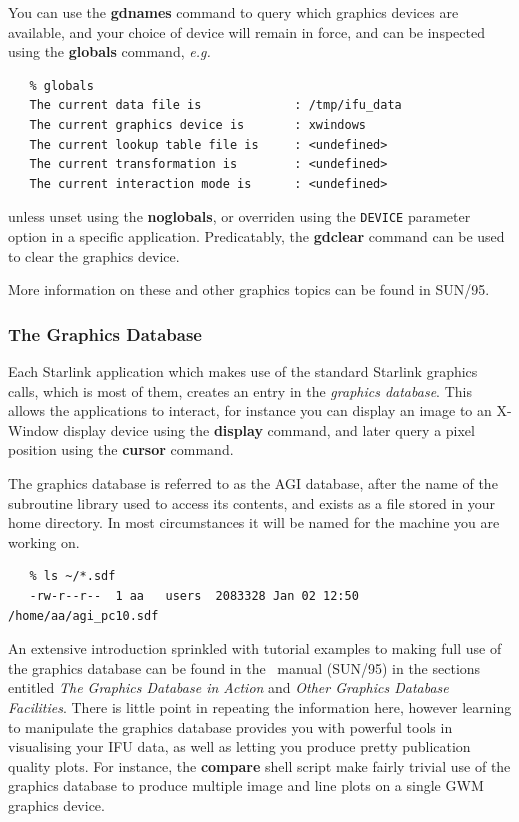 \documentclass[twoside,11pt]{article}
\newcommand{\xref}[3]{#1}
\begin{document}
{You can use the \xref{{\bf gdnames}}{sun95}{GDNAMES} command to query which
graphics devices are available, and your choice of device will remain
in force, and can be inspected using the
\xref{{\bf globals}}{sun95}{GLOBALS} command, \emph{e.g.}\

\small\begin{verbatim}
   % globals
   The current data file is             : /tmp/ifu_data
   The current graphics device is       : xwindows
   The current lookup table file is     : <undefined>
   The current transformation is        : <undefined>
   The current interaction mode is      : <undefined>
\end{verbatim}\normalsize

unless unset using the \xref{{\bf noglobals}}{sun95}{NOGLOBALS}, or
overriden using the {\tt DEVICE} parameter option in a specific
application.  Predicatably, the \xref{{\bf gdclear}}{sun95}{GDCLEAR}
command can be used to clear the graphics device.

More information on these and other graphics topics can be found in
\xref{SUN/95}{sun95}{}.

\subsubsection{The Graphics Database}

Each Starlink application which makes use of the standard Starlink
graphics calls, which is most of them, creates an entry in the
{\em graphics database}.  This allows the applications to interact, for
instance you can display an image to an X-Window display device using
the {\bf display} command, and later query a pixel position using the 
{\bf cursor} command.

The graphics database is referred to as the AGI database, after the
name of the \xref{subroutine library}{sun48}{} used to access its
contents, and exists as a file stored in your home directory.  In most
circumstances it will be named for the machine you are working on.

\small\begin{verbatim}
   % ls ~/*.sdf
   -rw-r--r--  1 aa   users  2083328 Jan 02 12:50  /home/aa/agi_pc10.sdf
\end{verbatim}\normalsize

An extensive introduction sprinkled with tutorial examples to making
full use of the \xref{graphics database}{sun95}{se_agitate} can be
found in the \KAPPA\ manual (SUN/95) in the sections entitled
\xref{{\em The Graphics Database in Action}}{sun95}{se_agiaction} and
\xref{{\em Other Graphics Database Facilities}}{sun95}{se_agiother}.
There is little point in repeating the information here, however
learning to manipulate the graphics database provides you with
powerful tools in visualising your IFU data, as well as letting you
produce pretty publication quality plots.  For instance, the \xref{{\bf
compare}}{sun237}{compare} shell script make fairly trivial use of the
graphics database to produce multiple image and line plots on a
single GWM graphics device.

}
\end{document}

